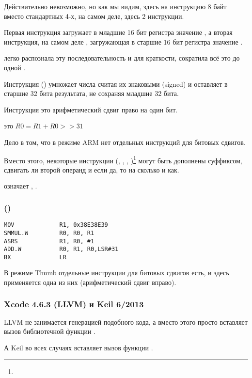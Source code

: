 Действительно невозможно, но как мы видим, здесь на инструкцию 8 байт вместо стандартных 4-х,
на самом деле, здесь 2 инструкции.

Первая инструкция загружает в младшие 16 бит регистра значение , а вторая инструкция, 
на самом деле , загружающая в старшие 16 бит регистра значение .

\IDA легко распознала эту последовательность и для краткости, сократила всё это до одной .

Инструкция  () 
умножает числа считая их знаковыми (signed) и оставляет в  старшие 32 бита результата, 
не сохраняя младшие 32 бита.

Инструкция это арифметический сдвиг право на один бит.

 это $R0=R1 + R0>>31$

\label{shifts_in_ARM_mode}
Дело в том, что в режиме ARM нет отдельных инструкций для битовых сдвигов.

Вместо этого, некоторые инструкции 
(\MOV, \ADD, \SUB, )\footnote{\DataProcessingInstructionsFootNote}
могут быть дополнены суффиксом, сдвигать ли второй операнд и если да, то на сколько и как.

 означает , \EMDASH{}.

\subsubsection{\OptimizingXcodeIV (\ThumbTwoMode)}

\begin{lstlisting}
MOV             R1, 0x38E38E39
SMMUL.W         R0, R0, R1
ASRS            R1, R0, #1
ADD.W           R0, R1, R0,LSR#31
BX              LR
\end{lstlisting}

В режиме Thumb отдельные инструкции для битовых сдвигов есть, и здесь применяется одна из них
\EMDASH{} (арифметический сдвиг вправо).

\subsubsection{\NonOptimizing Xcode 4.6.3 (LLVM) и Keil 6/2013}

\NonOptimizing LLVM 
не занимается генерацией подобного кода, а вместо этого просто вставляет вызов
библиотечной функции .

А Keil во всех случаях вставляет вызов функции .
